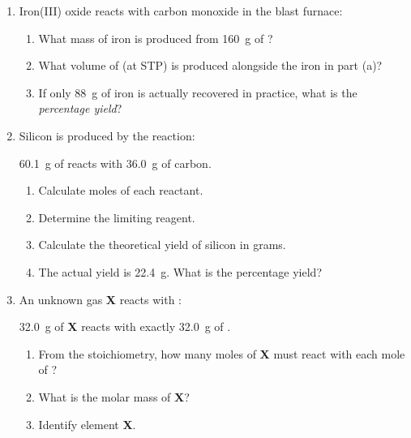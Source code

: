 \documentclass[12pt, a4paper]{book}
\theoremstyle{definition}
\newcommand{\newterm}[1]{\textit{\textcolor{DiscoveryColor}{#1}}}
\begin{document}
\begin{problembox}
\begin{enumerate}[label=\textbf{\arabic*.}]
  \item Iron(III) oxide reacts with carbon monoxide
        in the blast furnace:
        \begin{center}
        \end{center}
        \begin{enumerate}[label=(\alph*)]
          \item What mass of iron is produced from
                \SI{160}{\gram} of ?
          \item What volume of  (at STP) is produced
                alongside the iron in part (a)?
          \item If only \SI{88}{\gram} of iron is actually
                recovered in practice, what is the
                \newterm{percentage yield}?
        \end{enumerate}

  \item Silicon is produced by the reaction:
        \begin{center}
        \end{center}
        \SI{60.1}{\gram} of  reacts with
        \SI{36.0}{\gram} of carbon.
        \begin{enumerate}[label=(\alph*)]
          \item Calculate moles of each reactant.
          \item Determine the limiting reagent.
          \item Calculate the theoretical yield of silicon in grams.
          \item The actual yield is \SI{22.4}{\gram}.
                What is the percentage yield?
        \end{enumerate}

  \item An unknown gas \textbf{X} reacts with :
        \begin{center}
        \end{center}
        \SI{32.0}{\gram} of \textbf{X} reacts with exactly
        \SI{32.0}{\gram} of .
        \begin{enumerate}[label=(\alph*)]
          \item From the stoichiometry, how many moles of
                \textbf{X} must react with each mole of ?
          \item What is the molar mass of \textbf{X}?
          \item Identify element \textbf{X}.
        \end{enumerate}
\end{enumerate}
\end{problembox}
\end{document}
